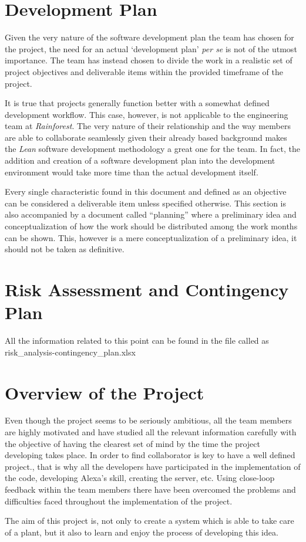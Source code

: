 \documentclass[english,runningheads,a4paper]{llncs}[2018/03/10]
\begin{document}
\section*{Development Plan}

Given the very nature of the software development plan the team has chosen for
the project, the need for an actual `development plan' \textit{per se} is not of
the utmost importance. The team has instead chosen to divide the work in a
realistic set of project objectives and deliverable items within the provided
timeframe of the project.

It is true that projects generally function better with a somewhat defined
development workflow. This case, however, is not applicable to the engineering
team at \textit{Rainforest}. The very nature of their relationship and the way
members are able to collaborate seamlessly given their already based background
makes the \textit{Lean} software development methodology a great one for the
team. In fact, the addition and creation of a software development plan into the
development environment would take more time than the actual development itself.

Every single characteristic found in this document and defined as an objective
can be considered a deliverable item unless specified otherwise. This section is
also accompanied by a document called ``planning'' where a preliminary idea and
conceptualization of how the work should be distributed among the work months
can be shown. This, however is a mere conceptualization of a preliminary idea,
it should not be taken as definitive.


\section*{Risk Assessment and Contingency Plan}

All the information related to this point can be found in the file called as  	  risk\_analysis-contingency\_plan.xlsx


\section*{Overview of the Project}

Even though the project seems to be seriously ambitious, all the team members are highly motivated
and have studied all the relevant information carefully with the objective of having the clearest
set of mind by the time the project developing takes place.
In order to find collaborator is key to have a well defined project., that is why all the
developers have participated in the implementation of  the code, developing Alexa's skill,
creating the server, etc.  Using close-loop feedback within the team members there have been
overcomed the problems and difficulties faced throughout the implementation of the project.

The aim of this project is, not only to create a system which is able to take care of a plant, but
it also to learn and enjoy the process of developing this idea.


\printbibliography
\end{document}
